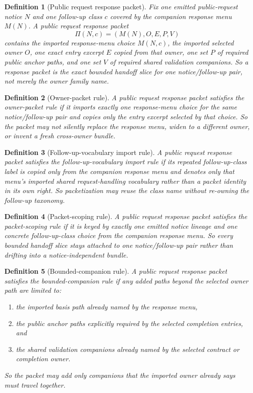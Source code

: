 \documentclass[11pt]{article}
\newtheorem{definition}{Definition}
\begin{document}
\begin{definition}[Public request response packet]
Fix one emitted public-request notice $N$ and one follow-up class $c$ covered by the companion response menu $M(N)$.
A \emph{public request response packet}
\[
\Pi(N,c)=(M(N),O,E,P,V)
\]
contains the imported response-menu choice $M(N,c)$, the imported selected owner $O$, one exact entry excerpt $E$ copied from that owner, one set $P$ of required public anchor paths, and one set $V$ of required shared validation companions.
So a response packet is the exact bounded handoff slice for one notice/follow-up pair, not merely the owner family name.
\end{definition}

\begin{definition}[Owner-packet rule]
A public request response packet satisfies the \emph{owner-packet rule} if it imports exactly one response-menu choice for the same notice/follow-up pair and copies only the entry excerpt selected by that choice.
So the packet may not silently replace the response menu, widen to a different owner, or invent a fresh cross-owner bundle.
\end{definition}

\begin{definition}[Follow-up-vocabulary import rule]
A public request response packet satisfies the \emph{follow-up-vocabulary import rule} if its repeated follow-up-class label is copied only from the companion response menu and denotes only that menu's imported shared request-handling vocabulary rather than a packet identity in its own right.
So packetization may reuse the class name without re-owning the follow-up taxonomy.
\end{definition}

\begin{definition}[Packet-scoping rule]
A public request response packet satisfies the \emph{packet-scoping rule} if it is keyed by exactly one emitted notice lineage and one concrete follow-up-class choice from the companion response menu.
So every bounded handoff slice stays attached to one notice/follow-up pair rather than drifting into a notice-independent bundle.
\end{definition}

\begin{definition}[Bounded-companion rule]
A public request response packet satisfies the \emph{bounded-companion rule} if any added paths beyond the selected owner path are limited to:
\begin{enumerate}[leftmargin=*]
\item the imported basis path already named by the response menu,
\item the public anchor paths explicitly required by the selected completion entries, and
\item the shared validation companions already named by the selected contract or completion owner.
\end{enumerate}
So the packet may add only companions that the imported owner already says must travel together.
\end{definition}
\end{document}
